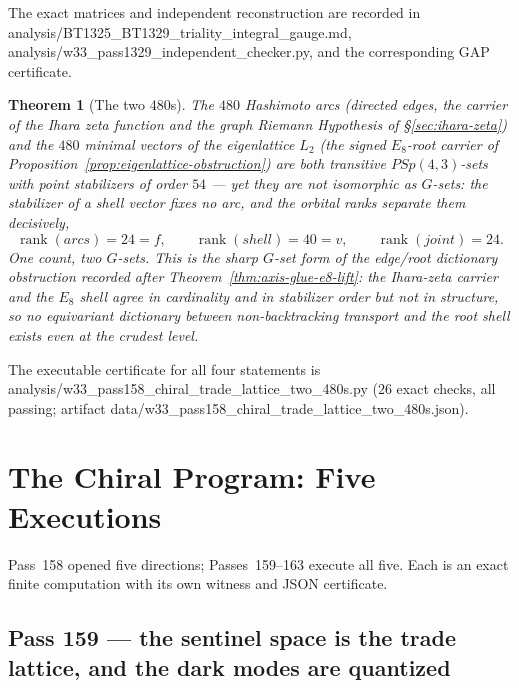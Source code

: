 \documentclass[12pt,a4paper]{article}
\def\mathrm#1{#1}%
\def\texttt#1{#1}%
\def\text#1{#1}%
\newtheorem{theorem}{Theorem}[section]
\theoremstyle{definition}
\begin{document}
\noindent
The exact matrices and independent reconstruction are recorded in
\texttt{analysis/BT1325\_BT1329\_triality\_integral\_gauge.md},
\texttt{analysis/w33\_pass1329\_independent\_checker.py}, and the
corresponding GAP certificate.

\begin{theorem}[The two 480s]
\label{thm:two-480s}
The $480$ Hashimoto arcs (directed edges, the carrier of the Ihara zeta
function and the graph Riemann Hypothesis of
\S\ref{sec:ihara-zeta}) and the $480$ minimal vectors of the eigenlattice
$L_2$ (the signed $E_8$-root carrier of
Proposition~\ref{prop:eigenlattice-obstruction}) are both transitive
$\mathrm{PSp}(4,3)$-sets with point stabilizers of order $54$ --- yet they
are \emph{not isomorphic} as $G$-sets: the stabilizer of a shell vector
fixes no arc, and the orbital ranks separate them decisively,
\[
  \operatorname{rank}(\text{arcs}) = 24 = f,
  \qquad
  \operatorname{rank}(\text{shell}) = 40 = v,
  \qquad
  \operatorname{rank}(\text{joint}) = 24 .
\]
One count, two $G$-sets. This is the sharp $G$-set form of the edge/root
dictionary obstruction recorded after
Theorem~\ref{thm:axis-glue-e8-lift}: the Ihara-zeta carrier and the $E_8$
shell agree in cardinality and in stabilizer order but not in structure, so
no equivariant dictionary between non-backtracking transport and the root
shell exists even at the crudest level.
\end{theorem}

\noindent The executable certificate for all four statements is
\texttt{analysis/w33\_pass158\_chiral\_trade\_lattice\_two\_480s.py}
($26$ exact checks, all passing; artifact
\texttt{data/w33\_pass158\_chiral\_trade\_lattice\_two\_480s.json}).

\section{The Chiral Program: Five Executions}
\label{sec:chiral-program}

Pass~158 opened five directions; Passes~159--163 execute all five. Each is
an exact finite computation with its own witness and JSON certificate.

\subsection{Pass 159 --- the sentinel space is the trade lattice, and the
dark modes are quantized}
\label{ssec:pass159}
\end{document}
